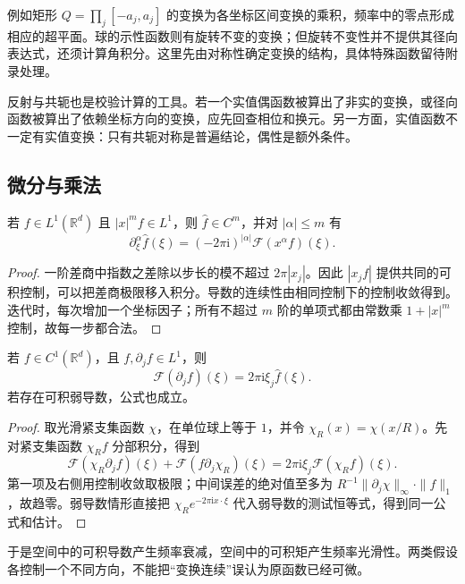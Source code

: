 例如矩形 \(Q=\prod_j[-a_j,a_j]\) 的变换为各坐标区间变换的乘积，频率中的零点形成相应的超平面。球的示性函数则有旋转不变的变换；但旋转不变性并不提供其径向表达式，还须计算角积分。这里先由对称性确定变换的结构，具体特殊函数留待附录处理。

\ProseParagraphBreak

反射与共轭也是校验计算的工具。若一个实值偶函数被算出了非实的变换，或径向函数被算出了依赖坐标方向的变换，应先回查相位和换元。另一方面，实值函数不一定有实值变换：只有共轭对称是普遍结论，偶性是额外条件。

\subsection{微分与乘法}
\label{b2:subsec:030105}

\begin{proposition}\label{b2:prop:03-moments}
若 \(f\in L^1(\mathbb R^d)\) 且 \(|x|^m f\in L^1\)，则 \(\widehat f\in C^m\)，并对 \(|\alpha|\leq m\) 有
\[
 \partial_\xi^\alpha\widehat f(\xi)
 =(-2\pi\mathrm{i})^{|\alpha|}\mathcal F(x^\alpha f)(\xi).
\]
\end{proposition}
\begin{proof}
一阶差商中指数之差除以步长的模不超过 \(2\pi|x_j|\)。因此 \(|x_jf|\) 提供共同的可积控制，可以把差商极限移入积分。导数的连续性由相同控制下的控制收敛得到。迭代时，每次增加一个坐标因子；所有不超过 \(m\) 阶的单项式都由常数乘 \(1+|x|^m\) 控制，故每一步都合法。
\end{proof}

\begin{proposition}\label{b2:prop:03-derivative}
若 \(f\in C^1(\mathbb R^d)\)，且 \(f,\partial_jf\in L^1\)，则
\[
 \mathcal F(\partial_jf)(\xi)=2\pi\mathrm{i}\xi_j\widehat f(\xi).
\]
若存在可积弱导数，公式也成立。
\end{proposition}
\begin{proof}
取光滑紧支集函数 \(\chi\)，在单位球上等于 \(1\)，并令 \(\chi_R(x)=\chi(x/R)\)。先对紧支集函数 \(\chi_Rf\) 分部积分，得到
\[
 \mathcal F(\chi_R\partial_jf)(\xi)
 +\mathcal F(f\partial_j\chi_R)(\xi)
 =2\pi\mathrm{i}\xi_j\mathcal F(\chi_Rf)(\xi).
\]
第一项及右侧用控制收敛取极限；中间误差的绝对值至多为 \(R^{-1}\|\partial_j\chi\|_\infty\cdot\|f\|_1\)，故趋零。弱导数情形直接把 \(\chi_Re^{-2\pi\mathrm{i}x\cdot\xi}\) 代入弱导数的测试恒等式，得到同一公式和估计。
\end{proof}

于是空间中的可积导数产生频率衰减，空间中的可积矩产生频率光滑性。两类假设各控制一个不同方向，不能把“变换连续”误认为原函数已经可微。
